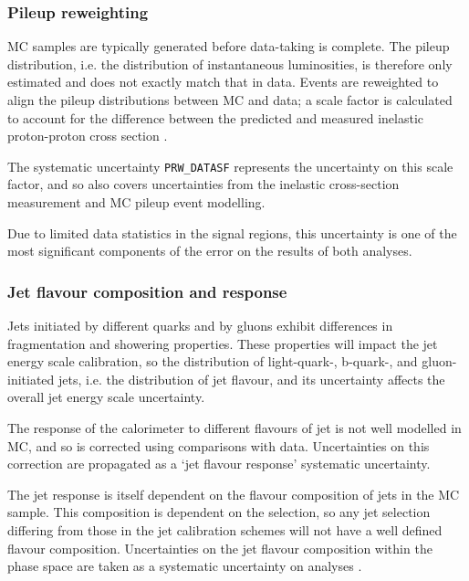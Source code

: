 \subsubsection{Pileup reweighting}
\label{sec:methods-systematics-prw}

\ac{MC} samples are typically generated before data-taking is complete. The
pileup distribution, i.e. the distribution of instantaneous luminosities, is
therefore only estimated and does not exactly match that in data. Events are
reweighted to align the pileup distributions between \ac{MC} and data; a scale
factor is calculated \cite{Buttinger2017} to account for the difference between
the predicted and measured inelastic proton-proton cross section
\cite{ATLASppxsec2016}.

The systematic uncertainty \verb|PRW_DATASF| represents the uncertainty on this
scale factor, and so also covers uncertainties from the inelastic cross-section
measurement and \ac{MC} pileup event modelling.

Due to limited data statistics in the signal regions, this uncertainty is one
of the most significant components of the error on the results of both
analyses.

\subsubsection{Jet flavour composition and response}
\label{sec:methods-systematics-jet-flavour}

Jets initiated by different quarks and by gluons exhibit differences in
fragmentation and showering properties. These properties will impact the jet
energy scale calibration, so the distribution of light-quark-, b-quark-,
and gluon-initiated jets, i.e. the distribution of jet flavour, and
its uncertainty affects the overall jet energy scale uncertainty.

The response of the calorimeter to different flavours of jet is not well
modelled in \ac{MC}, and so is corrected using comparisons with data.
Uncertainties on this correction are propagated as a `jet flavour response'
systematic uncertainty.

The jet response is itself dependent on the flavour composition of jets in the
\ac{MC} sample. This composition is dependent on the selection, so any jet
selection differing from those in the jet calibration schemes will not have a
well defined flavour composition. Uncertainties on the jet flavour composition
within the phase space are taken as a systematic uncertainty on analyses
\cite{JetFlavourUncerts2011}.

